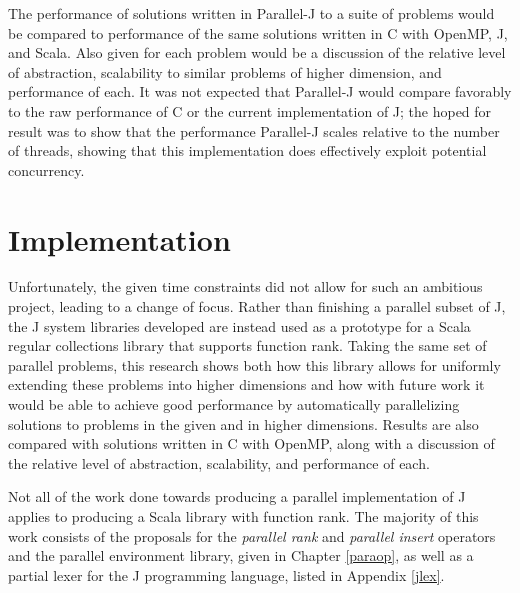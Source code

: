 The performance of solutions written in Parallel-J to a suite of problems would be compared to
performance of the same solutions written in C with OpenMP, J, and Scala.
Also given for each problem would be 
a discussion of the relative level of abstraction, scalability to similar problems of higher dimension, and performance of each. 
It was not expected that Parallel-J would compare favorably to the raw performance of C or the current implementation of J; 
the hoped for result was to show that the performance Parallel-J scales relative to the number of threads, 
showing that this implementation does effectively exploit potential concurrency.

\section{Implementation}
\label{imp}
Unfortunately, the given time constraints did not allow for such an ambitious project, 
leading to a change of focus.
Rather than finishing a parallel subset of J, the J system libraries developed 
are instead used as a prototype for a Scala regular collections library that supports function rank.
Taking the same set of parallel problems, 
this research shows both how this library allows for uniformly extending these problems into higher dimensions and 
how with future work it would be able to achieve good performance 
by automatically parallelizing solutions to problems in the given and in higher dimensions.
Results are also compared with solutions written in C with OpenMP, 
along with a discussion of the relative level of abstraction, scalability, and performance of each.

Not all of the work done towards producing a parallel implementation of J 
applies to producing a Scala library with function rank. 
The majority of this work consists of the proposals 
for the \textit{parallel rank} and \textit{parallel insert} operators and the parallel environment library, 
given in Chapter \ref{paraop}, 
as well as a partial lexer for the J programming language, listed in Appendix \ref{jlex}. 
